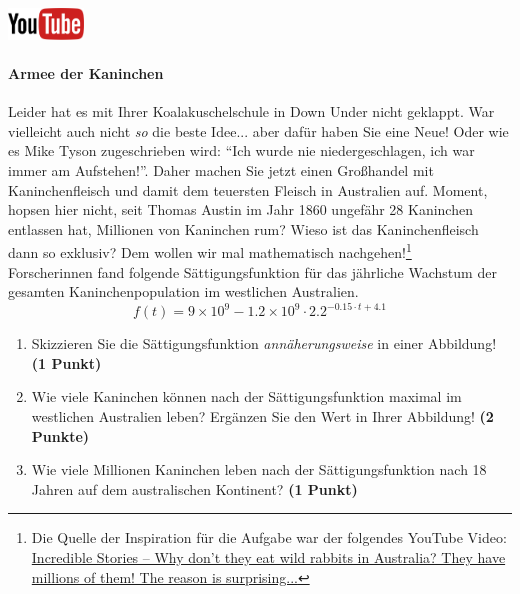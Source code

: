 \documentclass[a4paper, 9pt]{scrartcl}\usepackage[]{graphicx}\usepackage[]{xcolor}
\begin{document}
\hfill\href{https://youtu.be/Mr6eslls4J0}{\includegraphics[width =
  2cm]{img/youtube}} %
\hspace{2Ex}

\paragraph{Armee der Kaninchen}



Leider hat es mit Ihrer Koalakuschelschule in Down Under nicht geklappt. War vielleicht
auch nicht \textit{so} die beste Idee... aber daf{\"u}r haben Sie eine Neue!
Oder wie es Mike Tyson zugeschrieben wird: "`Ich wurde nie
niedergeschlagen, ich war immer am Aufstehen!"'. Daher machen Sie jetzt
einen Gro{\ss}handel mit Kaninchenfleisch und damit dem teuersten Fleisch in
Australien auf. Moment, hopsen hier nicht, seit Thomas Austin im Jahr
1860 ungef{\"a}hr 28 Kaninchen entlassen hat,
Millionen von Kaninchen rum? Wieso ist das Kaninchenfleisch dann so
exklusiv? Dem wollen wir mal mathematisch nachgehen!\footnote{Die Quelle
  der Inspiration f{\"u}r die Aufgabe war der folgendes YouTube Video:
  \href{https://youtu.be/38fuOr3tdgc?si=Li7NL_FoByML8JtT}{ Incredible
    Stories -- Why don't they eat wild rabbits in Australia? They have
    millions of them! The reason is surprising...}}
\\

Forscherinnen fand folgende S{\"a}ttigungsfunktion f{\"u}r das j{\"a}hrliche Wachstum
der gesamten Kaninchenpopulation im westlichen Australien.
\begin{equation*}
  f(t) = \ensuremath{9\times 10^{9}} - \ensuremath{1.2\times 10^{9}} \cdot 2.2^{-0.15 \cdot t + 4.1}
\end{equation*}

\begin{enumerate}
\item Skizzieren Sie die S{\"a}ttigungsfunktion \textit{ann{\"a}herungsweise} in einer Abbildung! \textbf{(1
    Punkt)}
\item Wie viele Kaninchen k{\"o}nnen nach der S{\"a}ttigungsfunktion maximal im
  westlichen Australien leben? Erg{\"a}nzen Sie den Wert in Ihrer Abbildung! \textbf{(2 Punkte)}
\item Wie viele Millionen Kaninchen leben nach der S{\"a}ttigungsfunktion
  nach 18 Jahren auf dem australischen Kontinent? \textbf{(1
    Punkt)}
\end{enumerate}
\end{document}
